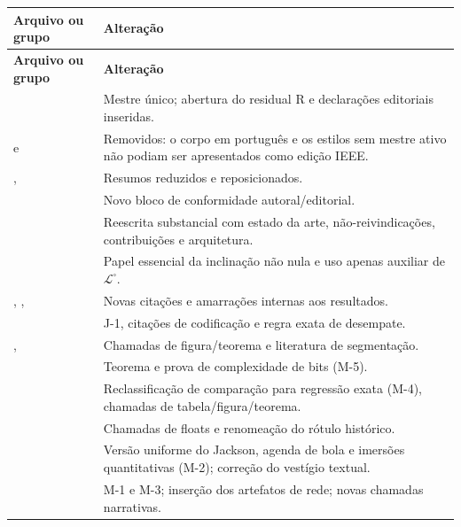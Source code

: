 \documentclass[11pt,a4paper]{article}
\newcommand{\LibraryMarked}{\mathcal L^{\square}}
\begin{document}
\begin{longtable}{L{0.38\textwidth}L{0.51\textwidth}}
\toprule
\textbf{Arquivo ou grupo} & \textbf{Alteração}\\
\midrule
\endfirsthead
\toprule
\textbf{Arquivo ou grupo} & \textbf{Alteração}\\
\midrule
\endhead
{} & Mestre único; abertura do residual R e declarações
editoriais inseridas.\\
 e  & Removidos: o corpo em
português e os estilos sem mestre ativo não podiam ser apresentados como edição IEEE.\\
,  & Resumos reduzidos e
reposicionados.\\
 & Novo bloco de conformidade autoral/editorial.\\
 & Reescrita substancial com estado da arte,
não-reivindicações, contribuições e arquitetura.\\
 & Papel essencial da inclinação não nula e uso apenas
auxiliar de $\LibraryMarked$.\\
,
,  & Novas citações e amarrações
internas aos resultados.\\
 & J-1, citações de codificação e regra exata de
desempate.\\
,
 & Chamadas de figura/teorema e literatura de
segmentação.\\
 & Teorema e prova de complexidade
de bits (M-5).\\
 & Reclassificação de comparação para
regressão exata (M-4), chamadas de tabela/figura/teorema.\\
 & Chamadas de floats e renomeação do rótulo
histórico.\\
 & Versão uniforme do Jackson, agenda de bola
e imersões quantitativas (M-2); correção do vestígio textual.\\
 & M-1 e M-3; inserção dos artefatos de rede;
novas chamadas narrativas.\\

\end{longtable}
\end{document}
